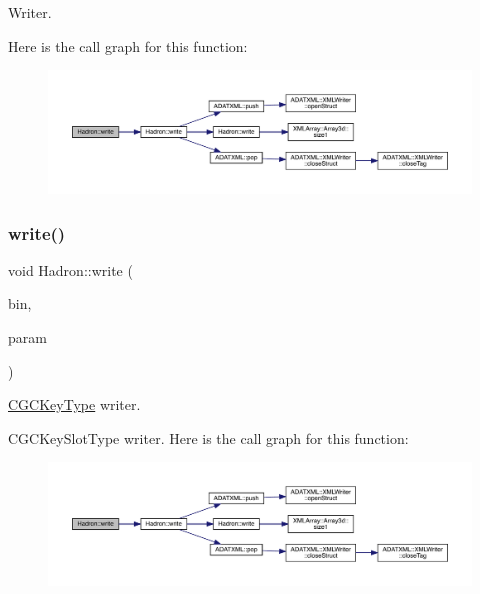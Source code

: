 Writer. 

Here is the call graph for this function\+:
\nopagebreak
\begin{figure}[H]
\begin{center}
\leavevmode
\includegraphics[width=350pt]{d1/daf/namespaceHadron_ab3f6a936fc8ba9b50904aca066146f48_cgraph}
\end{center}
\end{figure}
\mbox{\label{namespaceHadron_ae48dac33aabaaf829859c63a77a06b8b}} 
\subsubsection{\texorpdfstring{write()}{write()}\hspace{0.1cm}{\footnotesize\ttfamily [17/95]}}
{\footnotesize\ttfamily void Hadron\+::write (\begin{DoxyParamCaption}\item[{\mbox{\hyperlink{classADATIO_1_1BinaryWriter}{Binary\+Writer}} \&}]{bin,  }\item[{const \mbox{\hyperlink{structHadron_1_1KeyCGCIrrepMom__t}{Key\+C\+G\+C\+Irrep\+Mom\+\_\+t}} \&}]{param }\end{DoxyParamCaption})}



\mbox{\hyperlink{structHadron_1_1CGCKeyType}{C\+G\+C\+Key\+Type}} writer. 

C\+G\+C\+Key\+Slot\+Type writer. Here is the call graph for this function\+:
\nopagebreak
\begin{figure}[H]
\begin{center}
\leavevmode
\includegraphics[width=350pt]{d1/daf/namespaceHadron_ae48dac33aabaaf829859c63a77a06b8b_cgraph}
\end{center}
\end{figure}
\mbox{\label{namespaceHadron_af4fede7daa1a73ae6be48e039292c692}} 
